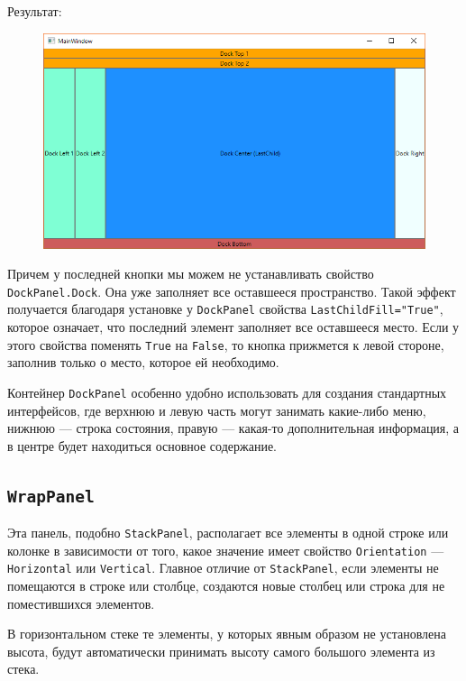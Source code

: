 \newpage
Результат:

\begin{figure}[H]
\centering
\includegraphics[width=1\textwidth]{manager_dockpanel.png}
\end{figure}


Причем у последней кнопки мы можем не устанавливать свойство \texttt{DockPanel.Dock}. Она уже заполняет все оставшееся пространство. Такой эффект получается благодаря установке у \texttt{DockPanel} свойства \texttt{LastChildFill="True"}, которое означает, что последний элемент заполняет все оставшееся место. Если у этого свойства поменять \texttt{True} на \texttt{False}, то кнопка прижмется к левой стороне, заполнив только о место, которое ей необходимо.

Контейнер \texttt{DockPanel} особенно удобно использовать для создания стандартных интерфейсов, где верхнюю и левую часть могут занимать какие-либо меню, нижнюю — строка состояния, правую — какая-то дополнительная информация, а в центре будет находиться основное содержание.

\subsection{\texttt{WrapPanel}}

Эта панель, подобно \texttt{StackPanel}, располагает все элементы в одной строке или колонке в зависимости от того, какое значение имеет свойство \texttt{Orientation} — \texttt{Horizontal} или \texttt{Vertical}. Главное отличие от \texttt{StackPanel}, если элементы не помещаются в строке или столбце, создаются новые столбец или строка для не поместившихся элементов.

В горизонтальном стеке те элементы, у которых явным образом не установлена высота, будут автоматически принимать высоту самого большого элемента из стека.


